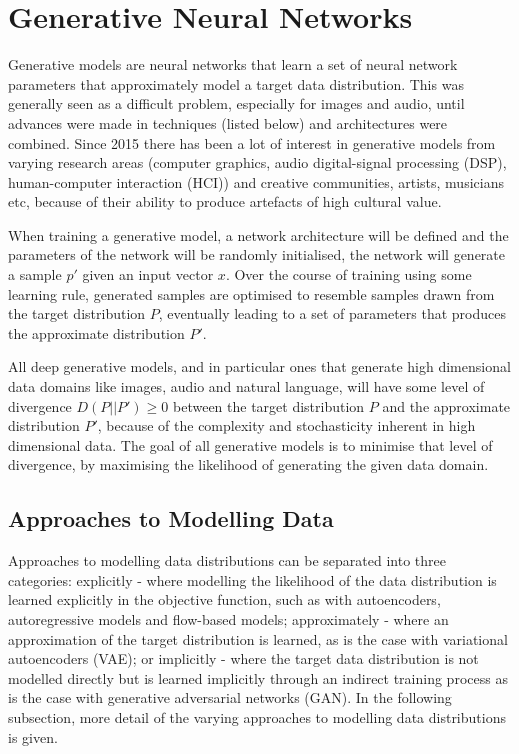  
\section{Generative Neural Networks}

Generative models are neural networks that learn a set of neural network parameters that approximately model a target data distribution. 
This was generally seen as a difficult problem, especially for images and audio, until advances were made in techniques (listed below) and architectures were combined. 
Since 2015 there has been a lot of interest in generative models from varying research areas (computer graphics, audio digital-signal processing (DSP), human-computer interaction (HCI)) and creative communities, artists, musicians etc, because of their ability to produce artefacts of high cultural value. 

When training a generative model, a network architecture will be defined and the parameters of the network will be randomly initialised, the network will generate a sample $p'$ given an input vector $x$. 
Over the course of training using some learning rule, generated samples are optimised to resemble samples drawn from the target distribution $P$, eventually leading to a set of parameters that produces the approximate distribution $P'$.

All deep generative models, and in particular ones that generate high dimensional data domains like images, audio and natural language, will have some level of divergence $D(P||P') \geq 0$ between the target distribution $P$ and the approximate distribution $P'$, because of the complexity and stochasticity inherent in high dimensional data. 
The goal of all generative models is to minimise that level of divergence, by maximising the likelihood of generating the given data domain.

\subsection{Approaches to Modelling Data}

Approaches to modelling data distributions can be separated into three categories: explicitly - where modelling the likelihood of the data distribution is learned explicitly in the objective function, such as with autoencoders, autoregressive models and flow-based models; approximately - where an approximation of the target distribution is learned, as is the case with variational autoencoders (VAE); or implicitly - where the target data distribution is not modelled directly but is learned implicitly through an indirect training process as is the case with generative adversarial networks (GAN).
In the following subsection, more detail of the varying approaches to modelling data distributions is given. 


